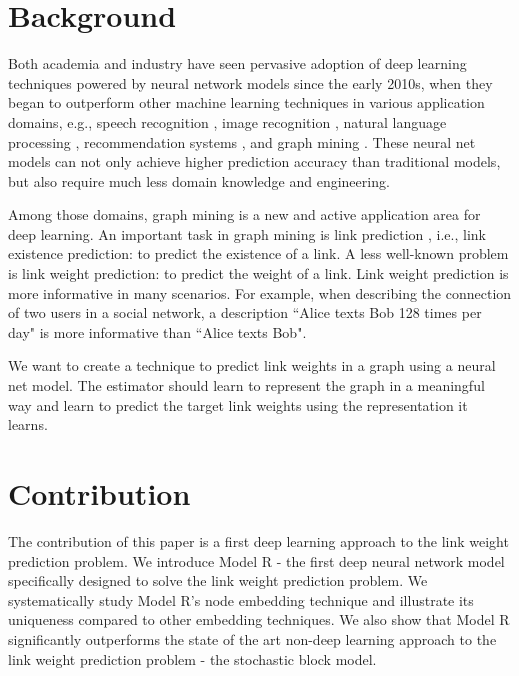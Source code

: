 \documentclass[book,12pt]{WSUThesis}
\theoremstyle{definition}
\begin{document}
\section{Background}
Both academia and industry have seen pervasive adoption of deep learning 
techniques powered by neural network models since the early 2010s,
when they began to outperform other machine learning techniques in various 
application domains, e.g.,
speech recognition \cite{hannun2014deep},
image recognition \cite{simonyan2014very},
natural language processing \cite{yao2013recurrent},
recommendation systems \cite{barkan2016item2vec},
and graph mining \cite{grover2016node2vec}.
These neural net models can not only achieve higher prediction accuracy than 
traditional models,
but also require much less domain knowledge and engineering.

Among those domains,
graph mining is a new and active application area for deep learning.
An important task in graph mining is link prediction \cite{liben2007link} 
\cite{al2006link}, i.e., link existence prediction:
to predict the existence of a link.
A less well-known problem is link weight prediction: to predict the weight of a link.
Link weight prediction is more informative in many scenarios.
For example, when describing the connection of two users in a social network,
a description ``Alice texts Bob 128 times per day" is more informative than
``Alice texts Bob".

We want to create a technique to predict link weights in a graph using a 
neural net model.
The estimator should learn to represent the graph in a meaningful way and learn to predict the target link weights using the representation it learns.

\section{Contribution}
The contribution of this paper is
a first deep learning approach to the link weight prediction problem.
We introduce Model R - the first deep neural network model specifically designed to solve the link weight prediction problem.
We systematically study Model R's node embedding technique and illustrate its uniqueness compared to other embedding techniques.
We also show that Model R significantly outperforms the state of the art non-deep learning approach to the link weight prediction problem - the stochastic block model.
\end{document}
